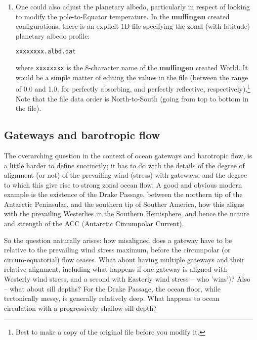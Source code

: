 \documentclass[11pt,fleqn]{book} %
\begin{document}
\begin{enumerate}
\begin{enumerate}
\item One could also adjust the planetary albedo, particularly in respect of looking to modify the pole-to-Equator temperature. In the \textbf{muffingen} created configurations, there is an explicit 1D file specifying the zonal (with latitude) planetary albedo profile:
\vspace{-2pt}\begin{verbatim}
xxxxxxxx.albd.dat
\end{verbatim}\vspace{-2pt}
where \texttt{xxxxxxxx} is the 8-character name of the \textbf{muffingen} created World. It would be a simple matter of editing the values in the file (between the range of 0.0 and 1.0, for  perfectly absorbing, and perfectly reflective, respectively).\footnote{Best to make a copy of the original file before you modify it.} Note that the file data order is North-to-South (going from top to bottom in the file).
\end{enumerate}
\end{enumerate}
\vspace{2mm}


\subsection{Gateways and barotropic flow}

The overarching question in the context of ocean gateways and barotropic flow, is a little harder to define succinctly; it has to do with the details of the degree of alignment (or not) of the prevailing wind (stress)
with  gateways, and the degree to which this give rise to strong zonal ocean flow. A good and obvious modern example is the existence of the Drake Passage, between the northern tip of the Antarctic Peninsular, and the southern tip of Souther America, how this aligns with the prevailing Westerlies in the Southern Hemisphere, and hence the nature and strength of the ACC (Antarctic Circumpolar Current).

So the question naturally arises: how misaligned does a gateway have to be relative to the prevailing wind stress maximum, before the circumpolar (or circum-equatorial) flow ceases. What about having multiple gateways and their relative alignment, including what happens if one gateway is aligned with Westerly wind stress, and a second with Easterly wind stress -- who 'wins')? Also -- what about sill depths? For the Drake Passage, the ocean floor, while tectonically messy, is generally relatively deep. What happens to ocean circulation with a progressively shallow sill depth?
\end{document}
